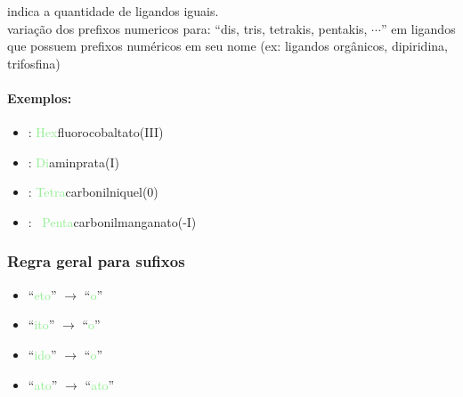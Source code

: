 \documentclass[12pt]{report}
\begin{document}
indica a quantidade de ligandos iguais.\\
variação dos prefixos numericos para: ``dis, tris, tetrakis, pentakis, $\cdots$'' em ligandos que possuem prefixos numéricos em seu nome (ex: ligandos orgânicos, dipiridina, trifosfina)\\

\noindent\begin{minipage}{\linewidth}

\paragraph{Exemplos:}\hfill\vspace{0.3cm}
\begin{multicols}{2}

	\begin{itemize}
	
	\item {}:
		\textcolor{LightGreen}{Hex}fluorocobaltato(III)
		
	\item {}:
		\textcolor{LightGreen}{Di}aminprata(I)
		
	\item {}:
		\textcolor{LightGreen}{Tetra}carbonilniquel(0)
		
	\item {}:
		\hbox{%
			\textcolor{LightGreen}{Penta}carbonilmanganato(-I)
		}
	\end{itemize}
	
\end{multicols}

\end{minipage}

\hypertarget{regras4}{}%
\subsubsection{Regra geral para sufixos}

\begin{multicols}{2}
	\begin{itemize}
	\item 
		``\textcolor{LightGreen}{eto}'' 
		$\to$ ``\textcolor{LightGreen}{o}''
	\item 
		``\textcolor{LightGreen}{ito}''
		$\to$ ``\textcolor{LightGreen}{o}''
	\item 
		``\textcolor{LightGreen}{ido}''
		$\to$ ``\textcolor{LightGreen}{o}''
	\item 
		``\textcolor{LightGreen}{ato}''
		$\to$ ``\textcolor{LightGreen}{ato}''
	\end{itemize}
\end{multicols}
\end{document}
